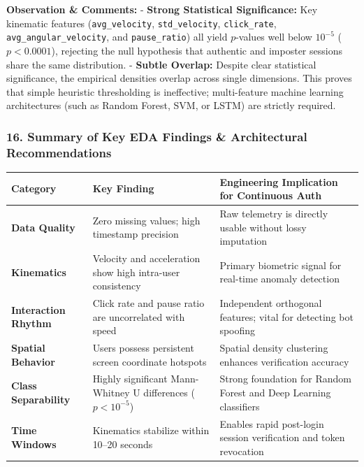 \documentclass[11pt]{article}
\begin{document}
    \textbf{Observation \& Comments:} - \textbf{Strong Statistical
Significance:} Key kinematic features (\texttt{avg\_velocity},
\texttt{std\_velocity}, \texttt{click\_rate},
\texttt{avg\_angular\_velocity}, and \texttt{pause\_ratio}) all yield
\(p\)-values well below \(10^{-5}\) (\(p < 0.0001\)), rejecting the null
hypothesis that authentic and imposter sessions share the same
distribution. - \textbf{Subtle Overlap:} Despite clear statistical
significance, the empirical densities overlap across single dimensions.
This proves that simple heuristic thresholding is ineffective;
multi-feature machine learning architectures (such as Random Forest,
SVM, or LSTM) are strictly required.

    \subsubsection{16. Summary of Key EDA Findings \& Architectural
Recommendations}\label{summary-of-key-eda-findings-architectural-recommendations}

{\def\LTcaptype{none} %
\begin{longtable}[]{@{}
  >{\raggedright\arraybackslash}p{}
  >{\raggedright\arraybackslash}p{}
  >{\raggedright\arraybackslash}p{}@{}}
\toprule\noalign{}
\begin{minipage}[b]{\linewidth}\raggedright
Category
\end{minipage} & \begin{minipage}[b]{\linewidth}\raggedright
Key Finding
\end{minipage} & \begin{minipage}[b]{\linewidth}\raggedright
Engineering Implication for Continuous Auth
\end{minipage} \\
\midrule\noalign{}
\endhead
\bottomrule\noalign{}
\endlastfoot
\textbf{Data Quality} & Zero missing values; high timestamp precision &
Raw telemetry is directly usable without lossy imputation \\
\textbf{Kinematics} & Velocity and acceleration show high intra-user
consistency & Primary biometric signal for real-time anomaly
detection \\
\textbf{Interaction Rhythm} & Click rate and pause ratio are
uncorrelated with speed & Independent orthogonal features; vital for
detecting bot spoofing \\
\textbf{Spatial Behavior} & Users possess persistent screen coordinate
hotspots & Spatial density clustering enhances verification accuracy \\
\textbf{Class Separability} & Highly significant Mann-Whitney U
differences (\(p < 10^{-5}\)) & Strong foundation for Random Forest and
Deep Learning classifiers \\
\textbf{Time Windows} & Kinematics stabilize within 10--20 seconds &
Enables rapid post-login session verification and token revocation \\
\end{longtable}
}
\end{document}
